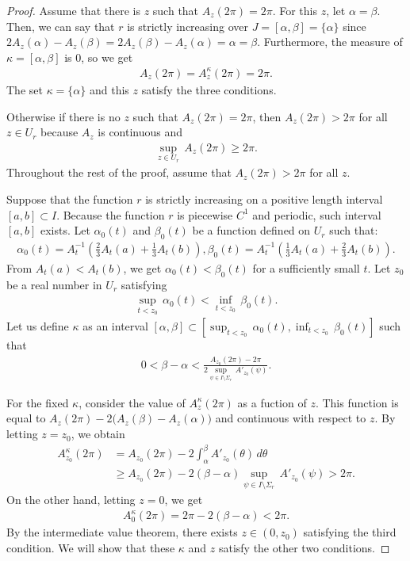 \documentclass{amsart}
\theoremstyle{plain}
\theoremstyle{definition}
\theoremstyle{remark}
\begin{document}
\begin{proof}%
Assume that there is $z$ such that $A_z(2\pi)=2\pi$.
For this $z$, let $\alpha=\beta$.
Then, we can say that $r$ is strictly increasing over $J=[\alpha,\beta]=\{\alpha\}$ since $2A_z(\alpha)-A_z(\beta)=2A_z(\beta)-A_z(\alpha)=\alpha=\beta$.
Furthermore, the measure of $\kappa=[\alpha,\beta]$ is $0$, so we get
\begin{align*}
A_z(2\pi)=A_z^{\kappa}(2\pi)=2\pi.
\end{align*}
The set $\kappa=\{\alpha\}$ and this $z$ satisfy the three conditions.

Otherwise if there is no $z$ such that $A_z(2\pi)=2\pi$, then $A_z(2\pi)>2\pi$ for all $z\in U_r$ because $A_z$ is continuous and
\begin{align*}
\sup_{z\in U_r}\,A_z(2\pi)\ge2\pi.
\end{align*}
Throughout the rest of the proof, assume that $A_z(2\pi)>2\pi$ for all $z$.

Suppose that the function $r$ is strictly increasing on a positive length interval $[a,b]\subset I$.
Because the function $r$ is piecewise $C^1$ and periodic, such interval $[a,b]$ exists.
Let $\alpha_0(t)$ and $\beta_0(t)$ be a function defined on $U_r$ such that:
\begin{align*}
\alpha_0(t)=A_t^{-1}\left(\frac23A_t(a)+\frac13A_t(b)\right),\beta_0(t)=A_t^{-1}\left(\frac13A_t(a)+\frac23A_t(b)\right).
\end{align*}
From $A_t(a)<A_t(b)$, we get $\alpha_0(t)<\beta_0(t)$ for a sufficiently small $t$.
Let $z_0$ be a real number in $U_r$ satisfying
\begin{align*}
\sup_{t<z_0}\,\alpha_0(t)<\inf_{t<z_0}\,\beta_0(t).
\end{align*}
Let us define $\kappa$ as an interval $[\alpha,\beta]\subset\left[\sup_{t<z_0}\,\alpha_0(t),\inf_{t<z_0}\,\beta_0(t)\right]$ such that
\begin{align*}
0<\beta-\alpha<\frac{A_{z_0}(2\pi)-2\pi}{2\sup_{\psi\in I\setminus\Sigma_r}\,A'_{z_0}(\psi)}.
\end{align*}

For the fixed $\kappa$, consider the value of $A_z^{\kappa}(2\pi)$ as a fuction of $z$.
This function is equal to $A_z(2\pi)-2\bigl(A_z(\beta)-A_z(\alpha)\bigr)$ and continuous with respect to $z$.
By letting $z=z_0$, we obtain
\begin{align*}
A_{z_0}^{\kappa}(2\pi)
&= A_{z_0}(2\pi)-2\int_{\alpha}^{\beta}A'_{z_0}(\theta)\,d\theta \\
&\ge A_{z_0}(2\pi)-2(\beta-\alpha)\sup_{\psi\in I\setminus\Sigma_r}\,A'_{z_0}(\psi) >2\pi.
\end{align*}
On the other hand, letting $z=0$, we get
\begin{align*}
A_0^{\kappa}(2\pi)=2\pi-2(\beta-\alpha)<2\pi.
\end{align*}
By the intermediate value theorem, there exists $z\in(0,z_0)$ satisfying the third condition.
We will show that these $\kappa$ and $z$ satisfy the other two conditions.


\end{proof}
\end{document}
